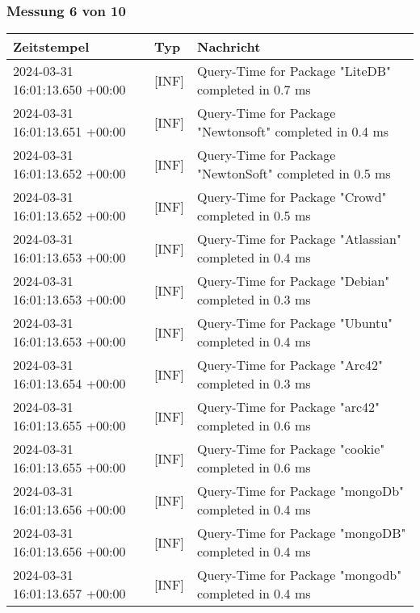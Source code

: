     \subsubsection{Messung 6 von 10} \label{subsubsec:MySQLMitIndex6von10}
        {
            {\small
                \begin{tabularx}{\textwidth}{|l|l|X|}
                    \hline
                    \textbf{Zeitstempel} & \textbf{Typ} & \textbf{Nachricht} \\
                    \hline
                    \endhead
                    2024-03-31 16:01:13.650 +00:00 & [INF] & Query-Time for Package "LiteDB" completed in 0.7 ms \\
                    2024-03-31 16:01:13.651 +00:00 & [INF] & Query-Time for Package "Newtonsoft" completed in 0.4 ms \\
                    2024-03-31 16:01:13.652 +00:00 & [INF] & Query-Time for Package "NewtonSoft" completed in 0.5 ms \\
                    2024-03-31 16:01:13.652 +00:00 & [INF] & Query-Time for Package "Crowd" completed in 0.5 ms \\
                    2024-03-31 16:01:13.653 +00:00 & [INF] & Query-Time for Package "Atlassian" completed in 0.4 ms \\
                    2024-03-31 16:01:13.653 +00:00 & [INF] & Query-Time for Package "Debian" completed in 0.3 ms \\
                    2024-03-31 16:01:13.653 +00:00 & [INF] & Query-Time for Package "Ubuntu" completed in 0.4 ms \\
                    2024-03-31 16:01:13.654 +00:00 & [INF] & Query-Time for Package "Arc42" completed in 0.3 ms \\
                    2024-03-31 16:01:13.655 +00:00 & [INF] & Query-Time for Package "arc42" completed in 0.6 ms \\
                    2024-03-31 16:01:13.655 +00:00 & [INF] & Query-Time for Package "cookie" completed in 0.6 ms \\
                    2024-03-31 16:01:13.656 +00:00 & [INF] & Query-Time for Package "mongoDb" completed in 0.4 ms \\
                    2024-03-31 16:01:13.656 +00:00 & [INF] & Query-Time for Package "mongoDB" completed in 0.4 ms \\
                    2024-03-31 16:01:13.657 +00:00 & [INF] & Query-Time for Package "mongodb" completed in 0.4 ms \\

\end{tabularx}}}
